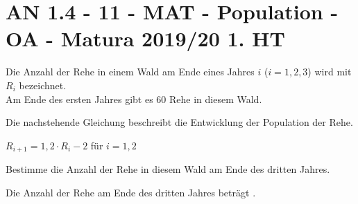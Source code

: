 \section{AN 1.4 - 11 - MAT - Population - OA - Matura 2019/20 1. HT}

\begin{beispiel}[AN 1.4]{1}
Die Anzahl der Rehe in einem Wald am Ende eines Jahres $i$ ($i=1,2,3$) wird mit $R_i$ bezeichnet.\\
Am Ende des ersten Jahres gibt es 60 Rehe in diesem Wald.

Die nachstehende Gleichung beschreibt die Entwicklung der Population der Rehe.

$R_{i+1}=1,2\cdot R_i-2$ für $i=1,2$

Bestimme die Anzahl der Rehe in diesem Wald am Ende des dritten Jahres.

Die Anzahl der Rehe am Ende des dritten Jahres beträgt\,\,.

\end{beispiel}